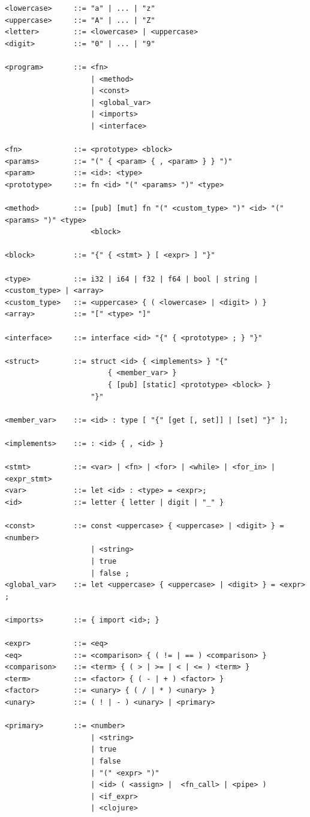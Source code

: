 ﻿\documentclass{article}
\begin{document}
\begin{verbatim}
<lowercase>     ::= "a" | ... | "z"
<uppercase>     ::= "A" | ... | "Z"
<letter>        ::= <lowercase> | <uppercase>
<digit>         ::= "0" | ... | "9"

<program>       ::= <fn> 
                    | <method> 
                    | <const> 
                    | <global_var> 
                    | <imports> 
                    | <interface>

<fn>            ::= <prototype> <block>
<params>        ::= "(" { <param> { , <param> } } ")"
<param>         ::= <id>: <type>
<prototype>     ::= fn <id> "(" <params> ")" <type>

<method>        ::= [pub] [mut] fn "(" <custom_type> ")" <id> "(" <params> ")" <type>
                    <block>

<block>         ::= "{" { <stmt> } [ <expr> ] "}"

<type>          ::= i32 | i64 | f32 | f64 | bool | string | <custom_type> | <array>
<custom_type>   ::= <uppercase> { ( <lowercase> | <digit> ) }
<array>         ::= "[" <type> "]"

<interface>     ::= interface <id> "{" { <prototype> ; } "}"

<struct>        ::= struct <id> { <implements> } "{" 
                        { <member_var> }
                        { [pub] [static] <prototype> <block> }
                    "}"

<member_var>    ::= <id> : type [ "{" [get [, set]] | [set] "}" ];

<implements>    ::= : <id> { , <id> }

<stmt>          ::= <var> | <fn> | <for> | <while> | <for_in> | <expr_stmt>
<var>           ::= let <id> : <type> = <expr>;
<id>            ::= letter { letter | digit | "_" }

<const>         ::= const <uppercase> { <uppercase> | <digit> } = <number> 
                    | <string>
                    | true
                    | false ;
<global_var>    ::= let <uppercase> { <uppercase> | <digit> } = <expr> ;

<imports>       ::= { import <id>; }

<expr>          ::= <eq>
<eq>            ::= <comparison> { ( != | == ) <comparison> }
<comparison>    ::= <term> { ( > | >= | < | <= ) <term> }
<term>          ::= <factor> { ( - | + ) <factor> }
<factor>        ::= <unary> { ( / | * ) <unary> }
<unary>         ::= ( ! | - ) <unary> | <primary>

<primary>       ::= <number> 
                    | <string>
                    | true
                    | false
                    | "(" <expr> ")" 
                    | <id> ( <assign> |  <fn_call> | <pipe> )
                    | <if_expr>
                    | <clojure>


\end{verbatim}
\end{document}
